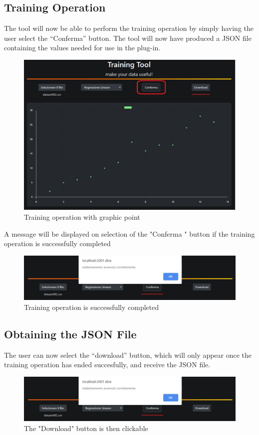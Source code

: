 \subsection{Training Operation}
The tool will now be able to perform the training operation by simply  having the user select the “Conferma” button. The tool will now have produced a JSON file containing the values needed for use in the plug-in.
\begin{figure}[H]
\centering
\includegraphics[scale=0.65]{img/tool/confirm.jpg}
\caption{Training operation with graphic point}
\end{figure}

A message will be displayed on selection of the "Conferma " button if the training operation is successfully completed
\newline
\begin{figure}[H]
\centering
\includegraphics[scale=0.65]{img/tool/ok_msg.jpg}
\caption{Training operation is successfully completed}
\end{figure}  

\subsection{Obtaining the JSON File}
The user can now select the “download” button, which will only appear once the training operation has ended succesfully, and receive the JSON file.
\begin{figure}[H]
\centering
\includegraphics[scale=0.65]{img/tool/ok_msg.jpg}
\caption{The "Download" button is then clickable}
\end{figure} 
